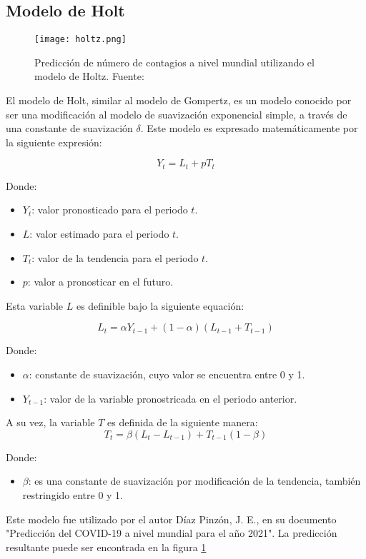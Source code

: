 \subsection{Modelo de Holt}
\begin{figure*}
    \texttt{[image: holtz.png]}
    \caption{Predicción de número de contagios a nivel mundial utilizando el modelo de Holtz. Fuente: \cite{diazpinzon_2020}}
    \label{holtz}
\end{figure*}

El modelo de Holt, similar al modelo de Gompertz, es un modelo conocido por ser una modificación al modelo de suavización exponencial simple, a través de una constante de suavización $\delta$. Este modelo es expresado matemáticamente por la siguiente expresión:

\begin{equation*}
    Y_t = L_t + p T_t
\end{equation*}

Donde:
\begin{itemize}
    \item $Y_t$: valor pronosticado para el periodo $t$.
    \item $L$: valor estimado para el periodo $t$.
    \item $T_t$: valor de la tendencia para el periodo $t$.
    \item $p$: valor a pronosticar en el futuro.
\end{itemize}

Esta variable $L$ es definible bajo la siguiente equación:

\begin{equation*}
    L_t = \alpha Y_{t-1} + (1-\alpha)(L_{t-1} + T_{t-1})
\end{equation*}

Donde:
\begin{itemize}
    \item $\alpha$: constante de suavización, cuyo valor se encuentra entre 0 y 1.
    \item $Y_{t-1}$: valor de la variable pronostricada en el periodo anterior.
\end{itemize}

A su vez, la variable $T$ es definida de la siguiente manera:
\begin{equation*}
    T_t = \beta (L_t - L_{t-1}) + T_{t-1} (1 - \beta)
\end{equation*}

Donde:
\begin{itemize}
    \item $\beta$: es una constante de suavización por modificación de la tendencia, también restringido entre 0 y 1.
\end{itemize}

Este modelo fue utilizado por el autor Díaz Pinzón, J. E., en su documento "Predicción del COVID-19 a nivel mundial para el año 2021"\cite{diazpinzon_2020}. La predicción resultante puede ser encontrada en la figura \ref{holtz}